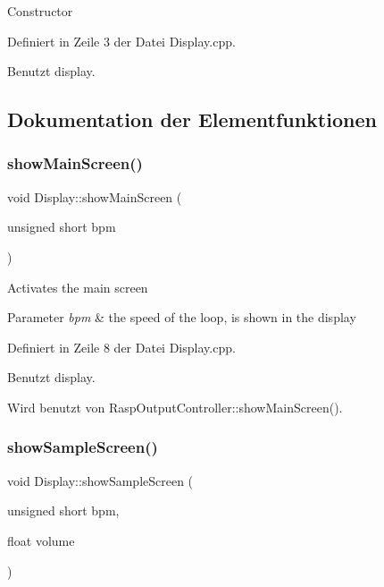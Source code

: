 Constructor 

Definiert in Zeile 3 der Datei Display.\+cpp.



Benutzt display.



\subsection{Dokumentation der Elementfunktionen}
\mbox{\label{class_display_aae248dcbc4c44b911c35918feacaf31a}} 
\subsubsection{\texorpdfstring{show\+Main\+Screen()}{showMainScreen()}}
{\footnotesize\ttfamily void Display\+::show\+Main\+Screen (\begin{DoxyParamCaption}\item[{unsigned short}]{bpm }\end{DoxyParamCaption})}

Activates the main screen 
\begin{DoxyParams}{Parameter}
{\em bpm} & the speed of the loop, is shown in the display \\
\hline
\end{DoxyParams}


Definiert in Zeile 8 der Datei Display.\+cpp.



Benutzt display.



Wird benutzt von Rasp\+Output\+Controller\+::show\+Main\+Screen().

\mbox{\label{class_display_ae00838dd994556524fb8d86d7e855770}} 
\subsubsection{\texorpdfstring{show\+Sample\+Screen()}{showSampleScreen()}}
{\footnotesize\ttfamily void Display\+::show\+Sample\+Screen (\begin{DoxyParamCaption}\item[{unsigned short}]{bpm,  }\item[{float}]{volume }\end{DoxyParamCaption})}

